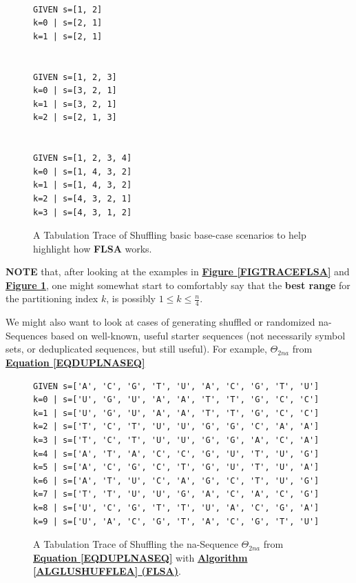 \documentclass[a4paper, 18pt]{book} %
\begin{document}
\begin{figure}[H]
  \begin{center}
\Large
\begin{verbatim}

GIVEN s=[1, 2]
k=0 | s=[2, 1]
k=1 | s=[2, 1]


GIVEN s=[1, 2, 3]
k=0 | s=[3, 2, 1]
k=1 | s=[3, 2, 1]
k=2 | s=[2, 1, 3]


GIVEN s=[1, 2, 3, 4]
k=0 | s=[1, 4, 3, 2]
k=1 | s=[1, 4, 3, 2]
k=2 | s=[4, 3, 2, 1]
k=3 | s=[4, 3, 1, 2]
\end{verbatim}

   \caption{A Tabulation Trace of Shuffling basic base-case scenarios to help highlight how \textbf{FLSA} works.}
  \label{FIGTRACEFLSASIMPLE}
  \end{center}
\end{figure}



\textbf{NOTE} that, after looking at the examples in \textbf{\hyperref[FIGTRACEFLSA]{Figure \ref{FIGTRACEFLSA}}} and \textbf{\hyperref[FIGTRACEFLSASIMPLE]{Figure \ref{FIGTRACEFLSASIMPLE}}}, one might somewhat start to comfortably say that the \textbf{best range} for the partitioning index $k$, is possibly $1 \leq k \leq \frac{n}{4}$.

We might also want to look at cases of generating shuffled or randomized na-Sequences based on well-known, useful starter sequences (not necessarily symbol sets, or deduplicated sequences, but still useful). For example, $\Theta_{2na}$ from \textbf{\hyperref[EQDUPLNASEQ]{Equation \ref{EQDUPLNASEQ}}}

\begin{figure}[H]
  \begin{center}
\Large
\begin{verbatim}
GIVEN s=['A', 'C', 'G', 'T', 'U', 'A', 'C', 'G', 'T', 'U']
k=0 | s=['U', 'G', 'U', 'A', 'A', 'T', 'T', 'G', 'C', 'C']
k=1 | s=['U', 'G', 'U', 'A', 'A', 'T', 'T', 'G', 'C', 'C']
k=2 | s=['T', 'C', 'T', 'U', 'U', 'G', 'G', 'C', 'A', 'A']
k=3 | s=['T', 'C', 'T', 'U', 'U', 'G', 'G', 'A', 'C', 'A']
k=4 | s=['A', 'T', 'A', 'C', 'C', 'G', 'U', 'T', 'U', 'G']
k=5 | s=['A', 'C', 'G', 'C', 'T', 'G', 'U', 'T', 'U', 'A']
k=6 | s=['A', 'T', 'U', 'C', 'A', 'G', 'C', 'T', 'U', 'G']
k=7 | s=['T', 'T', 'U', 'U', 'G', 'A', 'C', 'A', 'C', 'G']
k=8 | s=['U', 'C', 'G', 'T', 'T', 'U', 'A', 'C', 'G', 'A']
k=9 | s=['U', 'A', 'C', 'G', 'T', 'A', 'C', 'G', 'T', 'U']
\end{verbatim}

   \caption{A Tabulation Trace of Shuffling the na-Sequence $\Theta_{2na}$ from \textbf{\hyperref[EQDUPLNASEQ]{Equation \ref{EQDUPLNASEQ}}} with \textbf{\hyperref[ALGLUSHUFFLEA]{Algorithm \ref{ALGLUSHUFFLEA} (FLSA)}}.}
  \label{FIGTRACEFLSA2NA}
  \end{center}
\end{figure}
\end{document}
